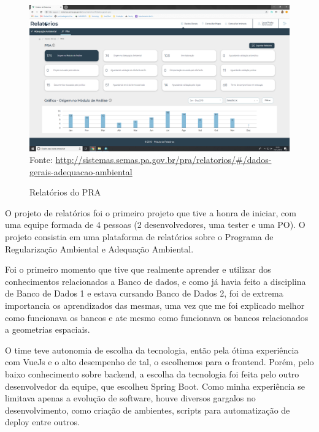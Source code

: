 \begin{figure}[H]
\centering
\caption{Relatórios do PRA} %
\includegraphics[scale=0.22]{relatorios-pra}\\  %
{\small Fonte: \url{http://sistemas.semas.pa.gov.br/pra/relatorios/#/dados-gerais-adequacao-ambiental}} %
\label{fig:exemplo} %
\end{figure}

O projeto de relatórios foi o primeiro projeto que tive a honra de iniciar, com uma equipe formada de 4 pessoas (2 desenvolvedores, uma tester e uma PO).
O projeto consistia em uma plataforma de relatórios sobre o Programa de Regularização Ambiental e Adequação Ambiental.

Foi o primeiro momento que tive que realmente aprender e utilizar dos conhecimentos relacionados a Banco de dados, e como já havia feito a disciplina de Banco de Dados 1 e estava cursando Banco de Dados 2, foi de extrema importancia os aprendizados das mesmas,
uma vez que me foi explicado melhor como funcionava os bancos e ate mesmo como funcionava os bancos relacionados a geometrias espaciais.

O time teve autonomia de escolha da tecnologia, então pela ótima experiência com VueJs e o alto desempenho de tal, o escolhemos para o frontend.
Porém, pelo baixo conhecimento sobre backend, a escolha da tecnologia foi feita pelo outro desenvolvedor da equipe, que escolheu Spring Boot.
Como minha experiência se limitava apenas a evolução de software, houve diversos gargalos no desenvolvimento, como criação de ambientes, scripts para automatização de deploy entre outros.


